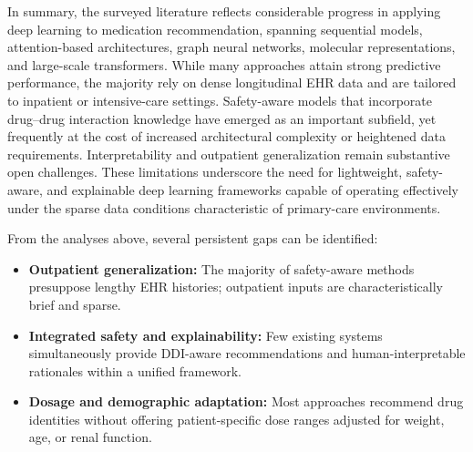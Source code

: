 In summary, the surveyed literature reflects considerable progress in applying deep learning to medication recommendation, spanning sequential models, attention-based architectures, graph neural networks, molecular representations, and large-scale transformers. While many approaches attain strong predictive performance, the majority rely on dense longitudinal EHR data and are tailored to inpatient or intensive-care settings. Safety-aware models that incorporate drug--drug interaction knowledge have emerged as an important subfield, yet frequently at the cost of increased architectural complexity or heightened data requirements. Interpretability and outpatient generalization remain substantive open challenges. These limitations underscore the need for lightweight, safety-aware, and explainable deep learning frameworks capable of operating effectively under the sparse data conditions characteristic of primary-care environments.


From the analyses above, several persistent gaps can be identified:
\begin{itemize}
    \item \textbf{Outpatient generalization:} The majority of safety-aware methods presuppose lengthy EHR histories; outpatient inputs are characteristically brief and sparse.
    \item \textbf{Integrated safety and explainability:} Few existing systems simultaneously provide DDI-aware recommendations and human-interpretable rationales within a unified framework.
    \item \textbf{Dosage and demographic adaptation:} Most approaches recommend drug identities without offering patient-specific dose ranges adjusted for weight, age, or renal function.
\end{itemize}
